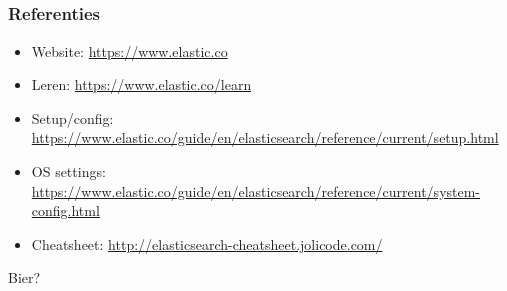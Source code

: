 \subsection{}
\begin{styleframe}
    \frametitle{Referenties}
\begin{itemize}
	\item Website: \url{https://www.elastic.co}
	\item Leren: \url{https://www.elastic.co/learn}
	\item Setup/config: \url{https://www.elastic.co/guide/en/elasticsearch/reference/current/setup.html}
	\item OS settings: \url{https://www.elastic.co/guide/en/elasticsearch/reference/current/system-config.html}
	\item Cheatsheet: \url{http://elasticsearch-cheatsheet.jolicode.com/}
\end{itemize}
\pause
\large Bier?
\end{styleframe}
